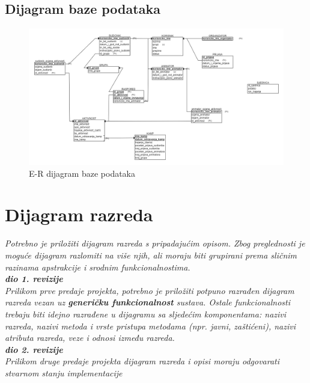 {			\subsection{Dijagram baze podataka}
				\begin{figure}[H]
				\centerline{\includegraphics[width=\linewidth]{slike/ER_model_baze.png}}
				\caption{E-R dijagram baze podataka}
				\label{fig:ERdijagram}
			\end{figure}
			
			\eject
			
			
		\section{Dijagram razreda}
		
			\textit{Potrebno je priložiti dijagram razreda s pripadajućim opisom. Zbog preglednosti je moguće dijagram razlomiti na više njih, ali moraju biti grupirani prema sličnim razinama apstrakcije i srodnim funkcionalnostima.}\\
			
			\textbf{\textit{dio 1. revizije}}\\
			
			\textit{Prilikom prve predaje projekta, potrebno je priložiti potpuno razrađen dijagram razreda vezan uz \textbf{generičku funkcionalnost} sustava. Ostale funkcionalnosti trebaju biti idejno razrađene u dijagramu sa sljedećim komponentama: nazivi razreda, nazivi metoda i vrste pristupa metodama (npr. javni, zaštićeni), nazivi atributa razreda, veze i odnosi između razreda.}\\
			
			\textbf{\textit{dio 2. revizije}}\\			
			
			\textit{Prilikom druge predaje projekta dijagram razreda i opisi moraju odgovarati stvarnom stanju implementacije}
			
}
